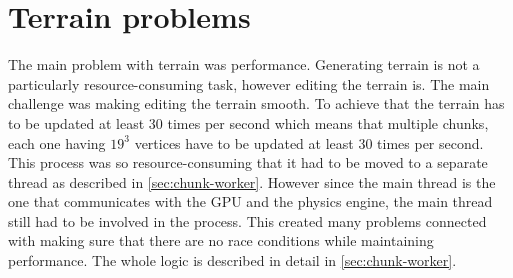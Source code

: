 \section{Terrain problems} \label{sec:terrain_problems}
The main problem with terrain was performance.
Generating terrain is not a particularly resource-consuming task, however editing the terrain is.
The main challenge was making editing the terrain smooth.
To achieve that the terrain has to be updated at least 30 times per second which means that multiple chunks, each one having $19^3$ vertices have to be updated at least 30 times per second.
This process was so resource-consuming that it had to be moved to a separate thread as described in \autoref{sec:chunk-worker}.
However since the main thread is the one that communicates with the GPU and the physics engine, the main thread still had to be involved in the process.
This created many problems connected with making sure that there are no race conditions while maintaining performance.
The whole logic is described in detail in \autoref{sec:chunk-worker}.